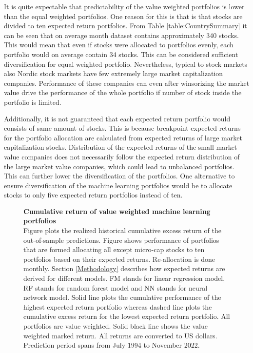 \documentclass[12pt]{article}
\begin{document}
It is quite expectable that predictability of the value weighted portfolios is lower than the equal weighted portfolios. One reason for this is that is that stocks are divided to ten expected return portfolios. From Table \ref{table:CountrySummary} it can be seen that on average month dataset contains approximately 340 stocks. This would mean that even if stocks were allocated to portfolios evenly, each portfolio would on average contain 34 stocks. This can be considered sufficient diversification for equal weighted portfolio. Nevertheless, typical to stock markets also Nordic stock markets have few extremely large market capitalization companies. Performance of these companies can even after winsorizing the market value drive the performance of the whole portfolio if number of stock inside the portfolio is limited. \par

Additionally, it is not guaranteed that each expected return portfolio would consists of same amount of stocks. This is because breakpoint expected returns for the portfolio allocation are calculated from expected returns of large market capitalization stocks. Distribution of the expected returns of the small market value companies does not necessarily follow the expected return distribution of the large market value companies, which could lead to unbalanced portfolios. This can further lower the diversification of the portfolios. One alternative to ensure diversification of the machine learning portfolios would be to allocate stocks to only five expected return portfolios instead of ten. \par

\begin{figure}[ht]
\centering
\caption[Cumulative return of value weighted machine learning portfolios]{\textbf{Cumulative return of value weighted machine learning portfolios}\\ Figure plots the realized historical cumulative excess return of the out-of-sample predictions. Figure shows performance of portfolios that are formed allocating all except micro-cap stocks to ten portfolios based on their expected returns. Re-allocation is done monthly. Section \ref{Methodology} describes how expected returns are derived for different models. FM stands for linear regression model, RF stands for random forest model and NN stands for neural network model. Solid line plots the cumulative performance of the highest expected return portfolio whereas dashed line plots the cumulative excess return for the lowest expected return portfolio. All portfolios are value weighted. Solid black line shows the value weighted marked return. All returns are converted to US dollars. Prediction period spans from July 1994 to November 2022.}

\label{plot:cumul_vw_portf_return}
\end{figure}
\end{document}
